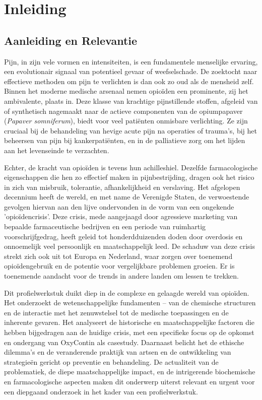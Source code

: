 \documentclass[11pt, a4paper]{report} %
\begin{document}
\setcounter{page}{1} %

\chapter{Inleiding}
\label{ch:inleiding}

\section{Aanleiding en Relevantie}
Pijn, in zijn vele vormen en intensiteiten, is een fundamentele menselijke ervaring, een evolutionair signaal van potentieel gevaar of weefselschade. De zoektocht naar effectieve methoden om pijn te verlichten is dan ook zo oud als de mensheid zelf. Binnen het moderne medische arsenaal nemen opioïden een prominente, zij het ambivalente, plaats in. Deze klasse van krachtige pijnstillende stoffen, afgeleid van of synthetisch nagemaakt naar de actieve componenten van de opiumpapaver (\textit{Papaver somniferum}), biedt voor veel patiënten onmisbare verlichting. Ze zijn cruciaal bij de behandeling van hevige acute pijn na operaties of trauma's, bij het beheersen van pijn bij kankerpatiënten, en in de palliatieve zorg om het lijden aan het levenseinde te verzachten.

Echter, de kracht van opioïden is tevens hun achilleshiel. Dezelfde farmacologische eigenschappen die hen zo effectief maken in pijnbestrijding, dragen ook het risico in zich van misbruik, tolerantie, afhankelijkheid en verslaving. Het afgelopen decennium heeft de wereld, en met name de Verenigde Staten, de verwoestende gevolgen hiervan aan den lijve ondervonden in de vorm van een ongekende 'opioïdencrisis'. Deze crisis, mede aangejaagd door agressieve marketing van bepaalde farmaceutische bedrijven en een periode van ruimhartig voorschrijfgedrag, heeft geleid tot honderdduizenden doden door overdosis en onnoemelijk veel persoonlijk en maatschappelijk leed. De schaduw van deze crisis strekt zich ook uit tot Europa en Nederland, waar zorgen over toenemend opioïdengebruik en de potentie voor vergelijkbare problemen groeien. Er is toenemende aandacht voor de trends in andere landen om lessen te trekken.

Dit profielwerkstuk duikt diep in de complexe en gelaagde wereld van opioïden. Het onderzoekt de wetenschappelijke fundamenten – van de chemische structuren en de interactie met het zenuwstelsel tot de medische toepassingen en de inherente gevaren. Het analyseert de historische en maatschappelijke factoren die hebben bijgedragen aan de huidige crisis, met een specifieke focus op de opkomst en ondergang van OxyContin als casestudy. Daarnaast belicht het de ethische dilemma's en de veranderende praktijk van artsen en de ontwikkeling van strategieën gericht op preventie en behandeling. De actualiteit van de problematiek, de diepe maatschappelijke impact, en de intrigerende biochemische en farmacologische aspecten maken dit onderwerp uiterst relevant en urgent voor een diepgaand onderzoek in het kader van een profielwerkstuk.
\end{document}
